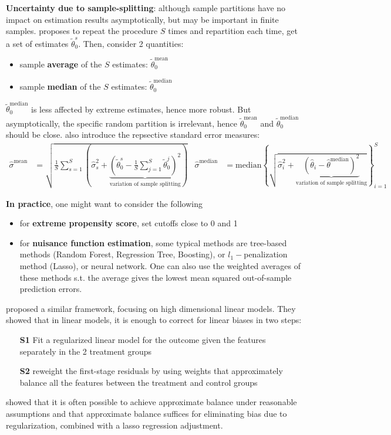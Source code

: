 \documentclass[twoside]{article}
\begin{document}
\textbf{Uncertainty due to sample-splitting}: although sample partitions have no impact on estimation results asymptotically, but may be important in finite samples. \citet{chernozhukov2017double} proposes to repeat the procedure $S$ times and repartition each time, get a set of estimates $\tilde{\theta}^s_0$.
Then, consider 2 quantities:
\begin{itemize}
    \item sample \textbf{average} of the $S$ estimates: $\tilde{\theta}_0^{\text{mean}}$
    \item sample \textbf{median} of the $S$ estimates: $\tilde{\theta}_0^{\text{median}}$
\end{itemize}
$\tilde{\theta}_0^{\text{median}}$ is less affected by extreme estimates, hence more robust. But asymptotically, the specific random partition is irrelevant, hence $\tilde{\theta}_0^{\text{mean}}$ and $\tilde{\theta}_0^{\text{median}}$ should be close.
\citet{chernozhukov2017double} also introduce the repsective standard error measures:
\begin{align*}
    \hat{\sigma}^{\text{mean}} &= \sqrt{\frac{1}{S}\sum^S_{s=1}\left(\hat{\sigma}^2_s+\underbrace{\left(\tilde{\theta}_0^s-\frac{1}{S}\sum^S_{j=1}\tilde{\theta}^j_0\right)^2}_{\text{variation of sample splitting}}\right)} & \hat{\sigma}^{\text{median}} &= \text{median} \left\{ \sqrt{\hat{\sigma}^2_i + \underbrace{\left(\hat{\theta}_i-\hat{\theta}^{\text{median}}\right)^2}_{\text{variation of sample splitting}} } \right\}^S_{i=1}
\end{align*}

\textbf{In practice}, one might want to consider the following
\begin{itemize}
    \item for \textbf{extreme propensity score}, set cutoffs close to 0 and 1 
    \item for \textbf{nuisance function estimation}, some typical methods are tree-based methods (Random Forest, Regression Tree, Boosting), or $l_1-$penalization method (Lasso), or neural network.
    One can also use the weighted averages of these methods s.t. the average gives the lowest mean squared out-of-sample prediction errors.
\end{itemize}

\citet{athey2018approximate} proposed a similar framework, focusing on high dimensional linear models. They showed that in linear models, it is enough to correct for linear biases in two steps:
\begin{itemize}
    \item[\textbf{S1}] Fit a regularized linear model for the outcome given the features separately in the 2 treatment groups 
    \item[\textbf{S2}] reweight the first-stage residuals by using weights that approximately balance all the features between the treatment and control groups
\end{itemize}
\citet{athey2018approximate} showed that it is often possible to achieve approximate balance under reasonable assumptions and that approximate balance suffices for eliminating bias due to regularization, combined with a lasso regression adjustment.
\end{document}
